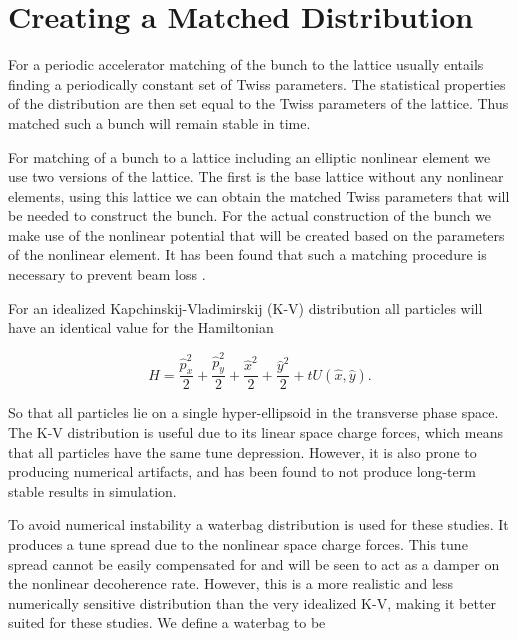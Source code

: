 \documentclass[aps,prstab,twocolumn, groupedaddress]{revtex4-1}
\begin{document}

\section{Creating a Matched Distribution}
For a periodic accelerator matching of the bunch to the lattice usually entails finding a 
periodically constant set of Twiss parameters. The statistical properties of the distribution 
are then set equal to the Twiss parameters of the lattice. Thus matched such a bunch will 
remain stable in time.

For matching of a bunch to a lattice including an elliptic nonlinear element we use two 
versions of the lattice. The first is the base lattice without any nonlinear elements, using 
this lattice we can obtain the matched Twiss parameters that will be needed to construct 
the bunch. For the actual construction of the bunch we make use of the nonlinear 
potential that will be created based on the parameters of the nonlinear element. It has 
been found that such a matching procedure is necessary to prevent beam loss 
\cite{Webb:2015ton}. 

For an idealized  Kapchinskij-Vladimirskij (K-V) distribution all particles will have an 
identical 
value for the Hamiltonian

	\begin{equation}
		H = \frac{\hat{p}^2_x}{2} +  \frac{\hat{p}^2_y}{2} +
		 \frac{\hat{x}^2}{2} + \frac{\hat{y}^2}{2} +
		 tU(\hat{x}, \hat{y}).
	\label{eq:hamiltonian}
	\end{equation}

So that all particles lie on a single hyper-ellipsoid in the transverse phase space. The 
K-V distribution is useful due to its linear space charge forces, which means that all 
particles have the same tune depression. However, it is also prone to producing numerical 
artifacts, and has been found to not produce long-term stable results in simulation.

To avoid numerical instability a waterbag distribution is used for these studies. It 
produces a tune spread due to the nonlinear space charge forces. This tune spread 
cannot be easily compensated for and will be seen to act as a damper on the nonlinear 
decoherence rate. However, this is a more realistic and less numerically sensitive 
distribution than the very idealized K-V, making it better suited for these studies. We 
define a waterbag to be
\end{document}
